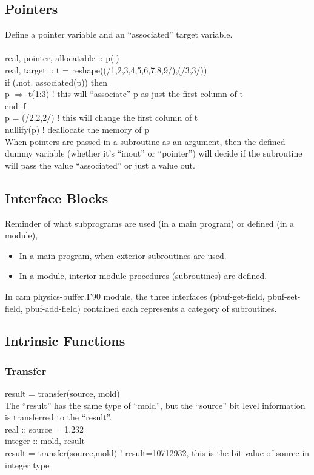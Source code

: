 \subsection{Pointers}
Define a pointer variable and an ``associated'' target variable. \\

 \\ 
real, pointer, allocatable :: p(:) \\
real, target :: t = reshape((/1,2,3,4,5,6,7,8,9/),(/3,3/)) \\
if (.not. associated(p)) then \\
\indent p $\Rightarrow$ t(1:3) ! this will ``associate'' p as just the first column of t \\
end if \\
p = (/2,2,2/) ! this will change the first column of t \\
nullify(p) ! deallocate the memory of p \\

When pointers are passed in a subroutine as an argument, then the defined dummy variable (whether it's ``inout'' or ``pointer'')
will decide if the subroutine will pass the value ``associated'' or just a value out.


\subsection{Interface Blocks}
Reminder of what subprograms are used (in a main program) or defined (in a module),
\begin{itemize}
    \item In a main program, when exterior subroutines are used.
    \item In a module, interior module procedures (subroutines) are defined.         
\end{itemize}
In cam physics-buffer.F90 module, the three interfaces (pbuf-get-field, pbuf-set-field, pbuf-add-field) 
contained each represents a category of subroutines.


\subsection{Intrinsic Functions}
     \subsubsection{Transfer}
          result = transfer(source, mold) \\
          The ``result'' has the same type of ``mold'', but the ``source'' bit level information is transferred to the ``result''.
           \\
              real :: source = 1.232 \\
              integer :: mold, result \\
              result = transfer(source,mold) ! result=10712932, this is the bit value of source in integer type  \\
              
